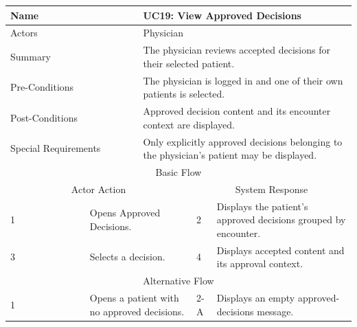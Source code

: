 \begin{reporttable}
\centering
\small
\caption{UC19: View Approved Decisions.}
\label{tab:kashaf:uc19}
\begin{tabular}{|p{}|p{}|p{}|p{}|p{}|}
\hline
\multicolumn{2}{|p{\dimexpr0.225\textwidth+2\tabcolsep+\arrayrulewidth\relax}|}{Name} & \multicolumn{3}{p{\dimexpr0.575\textwidth+4\tabcolsep+2\arrayrulewidth\relax}|}{UC19: View Approved Decisions} \\ \hline
\multicolumn{2}{|p{\dimexpr0.225\textwidth+2\tabcolsep+\arrayrulewidth\relax}|}{Actors} & \multicolumn{3}{p{\dimexpr0.575\textwidth+4\tabcolsep+2\arrayrulewidth\relax}|}{Physician} \\ \hline
\multicolumn{2}{|p{\dimexpr0.225\textwidth+2\tabcolsep+\arrayrulewidth\relax}|}{Summary} & \multicolumn{3}{p{\dimexpr0.575\textwidth+4\tabcolsep+2\arrayrulewidth\relax}|}{The physician reviews accepted decisions for their selected patient.} \\ \hline
\multicolumn{2}{|p{\dimexpr0.225\textwidth+2\tabcolsep+\arrayrulewidth\relax}|}{Pre-Conditions} & \multicolumn{3}{p{\dimexpr0.575\textwidth+4\tabcolsep+2\arrayrulewidth\relax}|}{The physician is logged in and one of their own patients is selected.} \\ \hline
\multicolumn{2}{|p{\dimexpr0.225\textwidth+2\tabcolsep+\arrayrulewidth\relax}|}{Post-Conditions} & \multicolumn{3}{p{\dimexpr0.575\textwidth+4\tabcolsep+2\arrayrulewidth\relax}|}{Approved decision content and its encounter context are displayed.} \\ \hline
\multicolumn{2}{|p{\dimexpr0.225\textwidth+2\tabcolsep+\arrayrulewidth\relax}|}{Special Requirements} & \multicolumn{3}{p{\dimexpr0.575\textwidth+4\tabcolsep+2\arrayrulewidth\relax}|}{Only explicitly approved decisions belonging to the physician's patient may be displayed.} \\ \hline
\multicolumn{5}{|c|}{Basic Flow} \\ \hline
\multicolumn{3}{|c|}{Actor Action} & \multicolumn{2}{c|}{System Response} \\ \hline
1 & \multicolumn{2}{p{\dimexpr0.37\textwidth+2\tabcolsep+\arrayrulewidth\relax}|}{Opens Approved Decisions.} & 2 & Displays the patient's approved decisions grouped by encounter. \\ \hline
3 & \multicolumn{2}{p{\dimexpr0.37\textwidth+2\tabcolsep+\arrayrulewidth\relax}|}{Selects a decision.} & 4 & Displays accepted content and its approval context. \\ \hline
\multicolumn{5}{|c|}{Alternative Flow} \\ \hline
1 & \multicolumn{2}{p{\dimexpr0.37\textwidth+2\tabcolsep+\arrayrulewidth\relax}|}{Opens a patient with no approved decisions.} & 2-A & Displays an empty approved-decisions message. \\ \hline
\end{tabular}
\end{reporttable}

